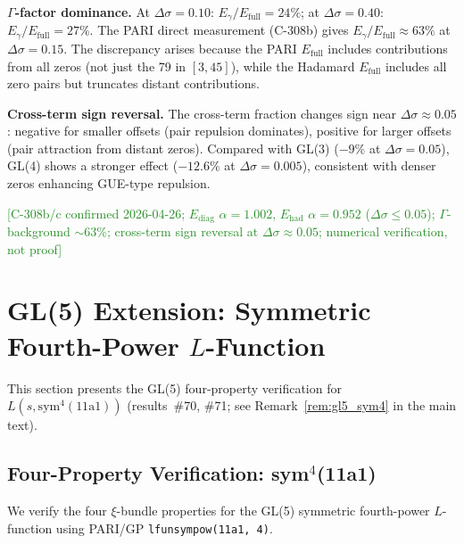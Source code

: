 \documentclass[11pt, a4paper]{article}
\theoremstyle{definition}
\theoremstyle{plain}
\begin{document}
\smallskip\noindent
\textbf{$\Gamma$-factor dominance.}\;
At $\Delta\sigma=0.10$: $E_\gamma/E_{\mathrm{full}}=24\%$;
at $\Delta\sigma=0.40$: $E_\gamma/E_{\mathrm{full}}=27\%$.
The PARI direct measurement (C-308b) gives $E_\gamma/E_{\mathrm{full}}
\approx 63\%$ at $\Delta\sigma=0.15$.
The discrepancy arises because the PARI $E_{\mathrm{full}}$ includes
contributions from all zeros (not just the 79 in $[3,45]$),
while the Hadamard $E_{\mathrm{full}}$ includes all zero pairs but
truncates distant contributions.

\smallskip\noindent
\textbf{Cross-term sign reversal.}\;
The cross-term fraction changes sign near $\Delta\sigma\approx 0.05$:
negative for smaller offsets (pair repulsion dominates),
positive for larger offsets (pair attraction from distant zeros).
Compared with GL(3) ($-9\%$ at $\Delta\sigma=0.05$),
GL(4) shows a stronger effect ($-12.6\%$ at $\Delta\sigma=0.005$),
consistent with denser zeros enhancing GUE-type repulsion.

\textcolor{ForestGreen}{[C-308b/c confirmed 2026-04-26;
$E_{\mathrm{diag}}$ $\alpha=1.002$,
$E_{\mathrm{had}}$ $\alpha=0.952$ ($\Delta\sigma\leq 0.05$);
$\Gamma$-background $\sim$63\%;
cross-term sign reversal at $\Delta\sigma\approx 0.05$;
numerical verification, not proof]}


\section{GL(5) Extension: Symmetric Fourth-Power $L$-Function}
\label{sec:gl5_extension}

This section presents the GL(5) four-property verification for
$L(s, \mathrm{sym}^4(11\mathrm{a}1))$ (results~\#70, \#71; see
Remark~\ref{rem:gl5_sym4} in the main text).

\subsection{Four-Property Verification: sym$^4$(11a1)}
\label{subsec:gl5_fourprop}

We verify the four $\xi$-bundle properties for the GL(5) symmetric fourth-power
$L$-function using PARI/GP \texttt{lfunsympow(11a1, 4)}.
\end{document}

